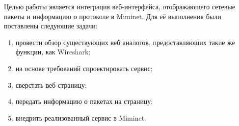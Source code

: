 
\label{sec:task}
 Целью работы является интеграция веб-интерфейса, отображающего сетевые пакеты и информацию о протоколе в Miminet. Для её выполнения были поставлены следующие задачи:
 \begin{enumerate}
 \item  провести обзор существующих веб аналогов, предоставляющих такие же функции, как Wireshark;
 \item  на основе требований спроектировать сервис;
 \item  сверстать веб-страницу;
 \item  передать информацию о пакетах на страницу;
 \item  внедрить реализованный сервис в Miminet.
\end{enumerate}
